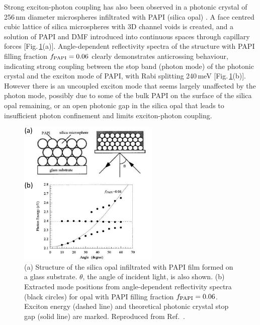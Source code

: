 Strong exciton-photon coupling has also been observed in a photonic crystal of 256\,nm diameter microspheres infiltrated with PAPI (silica opal) \cite{Sumioka2001}. A face centred cubic lattice of silica microspheres with 3D channel voids is created, and a solution of PAPI and DMF introduced into continuous spaces through capillary forces [Fig.\,\ref{2Fig21}(a)]. Angle-dependent reflectivity spectra of the structure with PAPI filling fraction $f_{\textnormal{PAPI}}=0.06$ clearly demonstrates anticrossing behaviour, indicating strong coupling between the stop band (photon mode) of the photonic crystal and the exciton mode of PAPI, with Rabi splitting 240\,meV [Fig.\,\ref{2Fig21}(b)]. However there is an uncoupled exciton mode that seems largely unaffected by the photon mode, possibly due to some of the bulk PAPI on the surface of the silica opal remaining, or an open photonic gap in the silica opal that leads to insufficient photon confinement and limits exciton-photon coupling. 
\begin{figure}[h!]
\centering
\includegraphics[width=0.6\textwidth]{Fig21}
\caption{(a) Structure of the silica opal infiltrated with PAPI film formed on a glass substrate. $\theta$, the angle of incident light, is also shown. (b) Extracted mode positions from angle-dependent reflectivity spectra (black circles) for opal with PAPI filling fraction $f_{\textnormal{PAPI}}=0.06$. Exciton energy (dashed line) and theoretical photonic crystal stop gap (solid line) are marked. Reproduced from Ref.\ \cite{Sumioka2001}.}
\label{2Fig21}
\end{figure}

